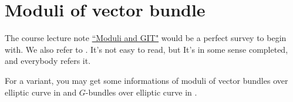 \section{Moduli of vector bundle}
The course lecture note \href{https://userpage.fu-berlin.de/hoskins/moduli_and_GIT.html}{``Moduli and GIT"} would be a perfect survey to begin with. We also refer to \cite{huybrechts2010geometry}. It's not easy to read, but It's in some sense completed, and everybody refers it.

For a variant, you may get some informations of moduli of vector bundles over elliptic curve in \cite{atiyah1957vector} and $G$-bundles over elliptic curve in \cite{frăţilă2020revisiting}.